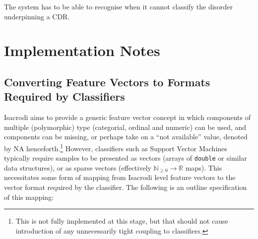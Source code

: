 \documentclass[a4paper,fleqn]{article}
\newcommand{\computercode}[1]{\texttt{#1}}
\begin{document}
The system has to be able to recognise when it cannot classify the
disorder underpinning a CDR.


\section{Implementation Notes}

\subsection{Converting Feature Vectors to Formats Required by
  Classifiers}

Isacrodi aims to provide a generic feature vector concept in which
components of multiple (polymorphic) type (categorial, ordinal and
numeric) can be used, and components can be missing, or perhaps take
on a ``not available'' value, denoted by NA henceforth.\footnote{This
  is not fully implemented at this stage, but that should not cause
  introduction of any unnecessarily tight coupling to classifiers.}
However, classifiers such as Support Vector Machines typically require
samples to be presented as vectors (arrays of \computercode{double} or
similar data structures), or as sparse vectors (effectively
$\mathds{N}_{\ge 0} \rightarrow \mathds{R}$ maps). This necessitates
some form of mapping from Isacrodi level feature vectors to the vector
format required by the classifier. The following is an outline
specification of this mapping:
\end{document}
